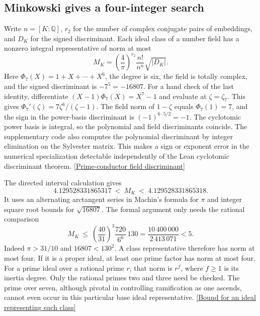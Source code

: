 \documentclass[12pt,letterpaper]{article}
\begin{document}
\subsection{Minkowski gives a four-integer search}

Write \(n=[K:\mathbb Q]\), \(r_2\) for the number of complex conjugate pairs of embeddings, and \(D_K\) for the signed discriminant. Each ideal class of a number field has a nonzero integral representative of norm at most
\[
 M_K=\left(\frac4\pi\right)^{r_2}\frac{n!}{n^n}\sqrt{|D_K|}.
\]
Here \(\Phi_7(X)=1+X+\cdots+X^6\), the degree is six, the field is totally complex, and the signed discriminant is \(-7^5=-16807\). For a hand check of the last identity, differentiate \((X-1)\Phi_7(X)=X^7-1\) and evaluate at \(\zeta=\zeta_7\). This gives \(\Phi_7'(\zeta)=7\zeta^6/(\zeta-1)\). The field norm of \(1-\zeta\) equals \(\Phi_7(1)=7\), and the sign in the power-basis discriminant is \((-1)^{6\cdot5/2}=-1\). The cyclotomic power basis is integral, so the polynomial and field discriminants coincide. The supplementary code also computes the polynomial discriminant by integer elimination on the Sylvester matrix. This makes a sign or exponent error in the numerical specialization detectable independently of the Lean cyclotomic discriminant theorem. \href{https://github.com/leanprover-community/mathlib4/blob/0df444a360eaa60ab8c11dca51a86af692955474/Mathlib/NumberTheory/NumberField/Cyclotomic/Basic.lean#L644-L658}{[Prime-conductor field discriminant]}

The directed interval calculation gives
\[
 4.129528331865317\ <\ M_K\ <\ 4.129528331865318 .
\]
It uses an alternating arctangent series in Machin's formula for \(\pi\) and integer square root bounds for \(\sqrt{16807}\). The formal argument only needs the rational comparison
\[
 M_K\ \le\ \left(\frac{40}{31}\right)^3\frac{720}{6^6}\,130
  =\frac{10\,400\,000}{2\,413\,071}<5 .
\]
Indeed \(\pi>31/10\) and \(16807<130^2\). A class representative therefore has norm at most four. If it is a proper ideal, at least one prime factor has norm at most four. For a prime ideal over a rational prime \(r\), that norm is \(r^f\), where \(f\ge1\) is its inertia degree. Only the rational primes two and three need be checked. The prime over seven, although pivotal in controlling ramification as one ascends, cannot even occur in this particular base ideal representative. \href{https://github.com/leanprover-community/mathlib4/blob/0df444a360eaa60ab8c11dca51a86af692955474/Mathlib/NumberTheory/NumberField/ClassNumber.lean#L77-L93}{[Bound for an ideal representing each class]}
\end{document}
